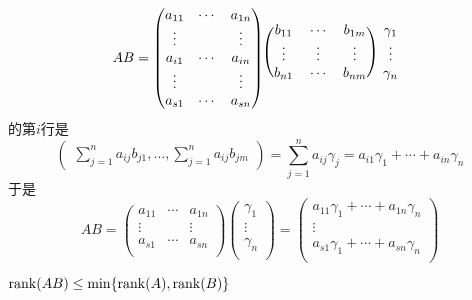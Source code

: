 \begin{Note}
\[
A B = 
\begin{pmatrix}
a_{11} & \cdots & a_{1n} \\
\vdots &        & \vdots \\
a_{i1} & \cdots & a_{in} \\
\vdots &        & \vdots \\
a_{s1} & \cdots & a_{sn} \\
\end{pmatrix}
\begin{blockarray}{cccc}
\begin{block}{(ccc)c}
b_{11} & \cdots & b_{1m} & \gamma_1 \\
\vdots & \vdots & \vdots & \vdots \\
b_{n1} & \cdots & b_{nm} & \gamma_n\\
\end{block}
\end{blockarray}
\]
的第$i$行是
\[
\begin{pmatrix}
\sum\limits_{j=1}^n a_{ij} b_{j1}, \ldots, \sum\limits_{j=1}^n a_{ij} b_{jm} \end{pmatrix} = 
\sum\limits_{j=1}^n a_{ij} \gamma_j =
a_{i1} \gamma_1 + \cdots + a_{in} \gamma_n
\]
于是
\[ 
AB = \begin{pmatrix}
a_{11} & \cdots & a_{1n} \\
\vdots &        & \vdots \\
a_{s1} & \cdots & a_{sn} \\
\end{pmatrix}
\begin{pmatrix}
\gamma_1 \\
\vdots \\
\gamma_n \\
\end{pmatrix}
= 
\begin{pmatrix}
a_{11} \gamma_1 + \cdots + a_{1n} \gamma_n \\
\vdots \\
a_{s1} \gamma_1 + \cdots + a_{sn} \gamma_n \\
\end{pmatrix}
\]
\end{Note}


\begin{Theorem}
$ \operatorname{rank}(AB) \le \min \{ \operatorname{rank}(A), \operatorname{rank}(B) \} $
\end{Theorem}

